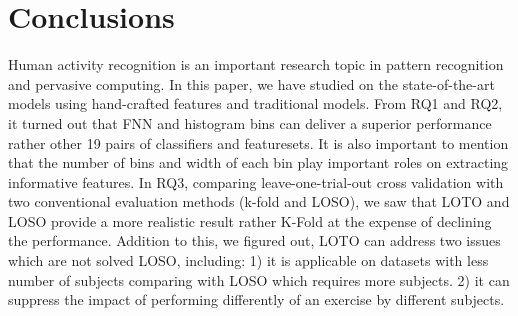 \documentclass[journal,article,submit,moreauthors,pdftex]{Definitions/mdpi}
\begin{document}
\section{Conclusions}

Human activity recognition is an important research topic
in pattern recognition and pervasive computing. In this paper, we have studied on the state-of-the-art models using hand-crafted features and traditional models. From RQ1 and RQ2, it turned out that FNN and histogram bins can deliver a superior performance rather other 19 pairs of classifiers and featuresets. It is also important to mention that the number of bins and width of each bin play important roles on extracting informative features. In RQ3, comparing leave-one-trial-out cross validation with two conventional evaluation methods (k-fold and LOSO), we saw that LOTO and LOSO provide a more realistic result rather K-Fold at the expense of declining the performance. Addition to this, we figured out, LOTO can address two issues which are not solved LOSO, including: 1) it is applicable on datasets with less number of subjects comparing with LOSO which requires more subjects. 2) it can suppress the impact of performing differently of an exercise by different subjects. 

\vspace{6pt} 



\end{document}
